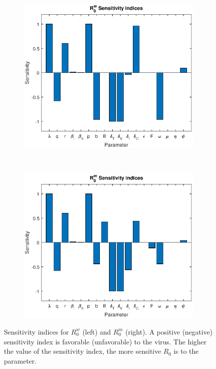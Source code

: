 \documentclass[11pt, oneside]{article}    %
\begin{document}
\begin{figure}[h]
    \centering
    \begin{subfigure}[b]{0.5\textwidth}
        \centering
        \includegraphics[scale=0.55]{rw_sen.eps}
    \end{subfigure}%
    ~ 
    \begin{subfigure}[b]{0.5\textwidth}
        \centering
        \includegraphics[scale=0.55]{rm_sen.eps}
    \end{subfigure}
    \caption{Sensitivity indices for $R_0^w$ (left) and $R_0^m$ (right). A positive (negative) sensitivity index is favorable (unfavorable) to the virus. The higher the value of the sensitivity index, the more sensitive $R_0$ is to the parameter.}
\label{fig:sen_ind}
\end{figure}
\end{document}

